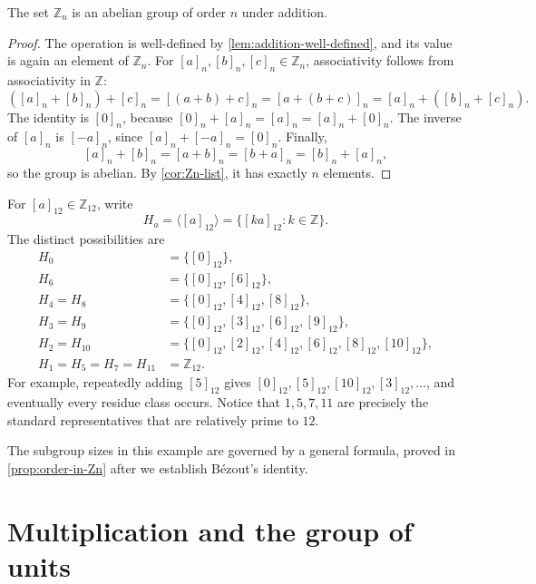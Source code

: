 \begin{theorem}\label{thm:Zn-additive-group}
	The set \(\mathbb Z_n\) is an abelian group of order \(n\) under addition.
\end{theorem}

\begin{proof}
	The operation is well-defined by \autoref{lem:addition-well-defined}, and its value is
	again an element of \(\mathbb Z_n\). For \([a]_n,[b]_n,[c]_n\in\mathbb Z_n\),
	associativity follows from associativity in \(\mathbb Z\):
	\[
		([a]_n+[b]_n)+[c]_n=[(a+b)+c]_n=[a+(b+c)]_n
		=[a]_n+([b]_n+[c]_n).
	\]
	The identity is \([0]_n\), because
	\([0]_n+[a]_n=[a]_n=[a]_n+[0]_n\). The inverse of \([a]_n\) is \([-a]_n\), since
	\([a]_n+[-a]_n=[0]_n\). Finally,
	\[
		[a]_n+[b]_n=[a+b]_n=[b+a]_n=[b]_n+[a]_n,
	\]
	so the group is abelian. By \autoref{cor:Zn-list}, it has exactly \(n\) elements.
\end{proof}

\begin{eg}\label{eg:subgroups-Z12}
	For \([a]_{12}\in\mathbb Z_{12}\), write
	\[
		H_a=\langle[a]_{12}\rangle
		=\{[ka]_{12}:k\in\mathbb Z\}.
	\]
	The distinct possibilities are
	\begin{align*}
		H_0&=\{[0]_{12}\},\\
		H_6&=\{[0]_{12},[6]_{12}\},\\
		H_4=H_8&=\{[0]_{12},[4]_{12},[8]_{12}\},\\
		H_3=H_9&=\{[0]_{12},[3]_{12},[6]_{12},[9]_{12}\},\\
		H_2=H_{10}&=\{[0]_{12},[2]_{12},[4]_{12},[6]_{12},[8]_{12},[10]_{12}\},\\
		H_1=H_5=H_7=H_{11}&=\mathbb Z_{12}.
	\end{align*}
	For example, repeatedly adding \([5]_{12}\) gives
	\([0]_{12},[5]_{12},[10]_{12},[3]_{12},\ldots\), and eventually every residue
	class occurs. Notice that \(1,5,7,11\) are precisely the standard representatives
	that are relatively prime to \(12\).
\end{eg}

The subgroup sizes in this example are governed by a general formula, proved in
\autoref{prop:order-in-Zn} after we establish B\'ezout's identity.

\section{Multiplication and the group of units}

